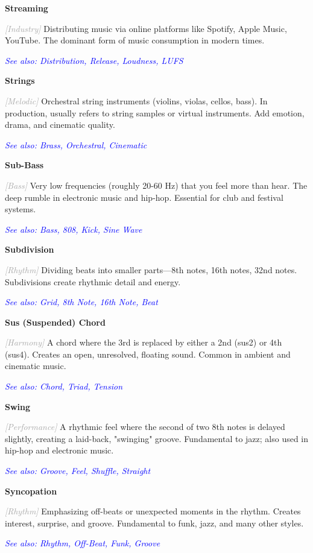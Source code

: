 \documentclass[11pt,letterpaper]{article}
\newcommand{\term}[1]{\textbf{\large\color{purple}#1}}
\newcommand{\category}[1]{\textcolor{darkgray}{\textit{\small [#1]}}}
\newcommand{\seealso}[1]{\textcolor{blue}{\textit{See also: #1}}}
\newenvironment{termdef}[1]
  {\noindent\term{#1}\par\nopagebreak}
  {\par\vspace{0.3em}}
\begin{document}
\begin{termdef}{Streaming}
\category{Industry}
Distributing music via online platforms like Spotify, Apple Music, YouTube. The dominant form of music consumption in modern times.

\seealso{Distribution, Release, Loudness, LUFS}
\end{termdef}

\begin{termdef}{Strings}
\category{Melodic}
Orchestral string instruments (violins, violas, cellos, bass). In production, usually refers to string samples or virtual instruments. Add emotion, drama, and cinematic quality.

\seealso{Brass, Orchestral, Cinematic}
\end{termdef}

\begin{termdef}{Sub-Bass}
\category{Bass}
Very low frequencies (roughly 20-60 Hz) that you feel more than hear. The deep rumble in electronic music and hip-hop. Essential for club and festival systems.

\seealso{Bass, 808, Kick, Sine Wave}
\end{termdef}

\begin{termdef}{Subdivision}
\category{Rhythm}
Dividing beats into smaller parts—8th notes, 16th notes, 32nd notes. Subdivisions create rhythmic detail and energy.

\seealso{Grid, 8th Note, 16th Note, Beat}
\end{termdef}

\begin{termdef}{Sus (Suspended) Chord}
\category{Harmony}
A chord where the 3rd is replaced by either a 2nd (sus2) or 4th (sus4). Creates an open, unresolved, floating sound. Common in ambient and cinematic music.

\seealso{Chord, Triad, Tension}
\end{termdef}

\begin{termdef}{Swing}
\category{Performance}
A rhythmic feel where the second of two 8th notes is delayed slightly, creating a laid-back, "swinging" groove. Fundamental to jazz; also used in hip-hop and electronic music.

\seealso{Groove, Feel, Shuffle, Straight}
\end{termdef}

\begin{termdef}{Syncopation}
\category{Rhythm}
Emphasizing off-beats or unexpected moments in the rhythm. Creates interest, surprise, and groove. Fundamental to funk, jazz, and many other styles.

\seealso{Rhythm, Off-Beat, Funk, Groove}
\end{termdef}
\end{document}
